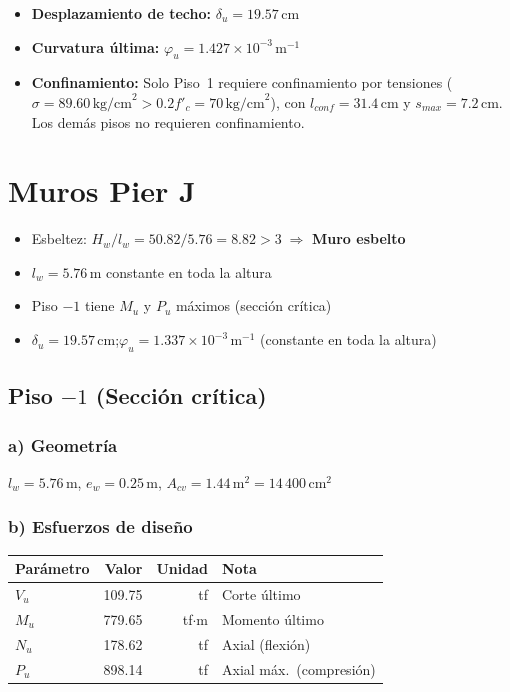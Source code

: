 \begin{itemize}
    \item \textbf{Desplazamiento de techo:} $\delta_u=19.57$\,cm
    \item \textbf{Curvatura última:} $\varphi_u=1.427\times10^{-3}$\,m$^{-1}$
    \item \textbf{Confinamiento:} Solo Piso~1 requiere confinamiento por tensiones
          ($\sigma=89.60\,\text{kg/cm}^2>0.2f'_c=70\,\text{kg/cm}^2$),
          con $l_{conf}=31.4$\,cm y $s_{max}=7.2$\,cm.
          Los demás pisos no requieren confinamiento.
\end{itemize}

\newpage

\section{Muros Pier J}

\begin{itemize}
    \item Esbeltez: $H_w/l_w=50.82/5.76=8.82>3\;\Rightarrow$ \textbf{Muro esbelto}
    \item $l_w=5.76$\,m constante en toda la altura
    \item Piso $-1$ tiene $M_u$ y $P_u$ máximos (sección crítica)
    \item $\delta_u = 19.57$\,cm;\quad $\varphi_u = 1.337\times10^{-3}$\,m$^{-1}$
          (constante en toda la altura)
\end{itemize}

\subsection{Piso $-1$ (Sección crítica)}

\subsubsection*{a) Geometría}
$l_w=5.76$\,m,\; $e_w=0.25$\,m,\; $A_{cv}=1.44$\,m$^2=14\,400$\,cm$^2$

\subsubsection*{b) Esfuerzos de diseño}
\begin{center}
\begin{tabular}{lrrl}\toprule
Parámetro & Valor & Unidad & Nota\\\midrule
$V_u$ & 109.75 & tf         & Corte último\\
$M_u$ & 779.65 & tf$\cdot$m & Momento último\\
$N_u$ & 178.62 & tf         & Axial (flexión)\\
$P_u$ & 898.14 & tf         & Axial máx.\ (compresión)\\\bottomrule
\end{tabular}
\end{center}

